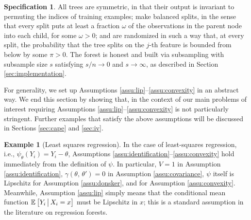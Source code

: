 \documentclass[aos]{imsart}
\theoremstyle{plain}
\theoremstyle{definition}
\newtheorem{exam}{Example}
\newtheorem{spec}{Specification}
\theoremstyle{remark}
\begin{document}
\begin{CJK}{UTF8}{gbsn}
\begin{spec}
\label{spec:forest}
All trees are symmetric, in that their output is invariant to permuting
the indices of training examples;
make balanced splits, in the sense that every split puts at least a fraction
$\omega$ of the observations in the parent node into each child, for some $\omega > 0$; and
are randomized in such a way that, at every split, the probability that
the tree splits on the $j$-th feature is bounded from below by some $\pi > 0$.
The forest is honest and built via subsampling
with subsample size $s$ satisfying $s/n \rightarrow 0$ and $s \rightarrow \infty$,
as described in Section \ref{sec:implementation}.
\end{spec}

For generality, we set up Assumptions \ref{assu:lip}--\ref{assu:convexity}
in an abstract way. We end this section by showing that, in the context of our
main problems of interest requiring Assumptions \ref{assu:lip}--\ref{assu:convexity} is
not particularly stringent. Further examples that satisfy the above assumptions will
be discussed in Sections \ref{sec:cape} and \ref{sec:iv}.

\begin{exam}[Least squares regression]
\label{exam:regression}
In the case of least-squares regression, i.e., $\psi_{\theta}(Y_i) = Y_i - \theta$,
Assumptions \ref{assu:identification}--\ref{assu:convexity} hold immediately from the
definition of $\psi$. In particular, $V = 1$ in Assumption \ref{assu:identification},
$\gamma(\theta, \, \theta') = 0$ in Assumption \ref{assu:covariance},
$\psi$ itself is Lipschitz for Assumption \ref{assu:donsker}, and 
 for Assumption \ref{assu:convexity}.
Meanwhile, Assumption \ref{assu:lip} simply means that
the conditional mean function $\mathbb{E}_{}\left[Y_i \,\big|\, X_i = x\right]$ must be Lipschitz in $x$;
this is a standard assumption in the literature on regression forests.
\end{exam}


\end{CJK}
\end{document}
